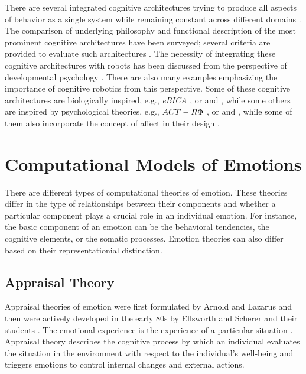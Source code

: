 \documentclass[12pt]{report}
\begin{document}
There are several integrated cognitive architectures trying to produce all
aspects of behavior as a single system while remaining constant across different
domains \cite{anderson:act-r, laird:soar}. The comparison of underlying
philosophy and functional description of the most prominent cognitive
architectures have been surveyed; several criteria are provided to evaluate such
architectures
\cite{chong:cognitive-architectures-survey,langley:cognitive-architectures,
thorisson:cognitive-architectures-autonomy}. The necessity of integrating these
cognitive architectures with robots has been discussed from the perspective of
developmental psychology \cite{asada:cognitive-robotics-humanoid,
d'mello:computational-functional-modeling,
kelley:cognitive-robotics-psychology}. There are also many examples emphasizing
the importance of cognitive robotics from this perspective. Some of these
cognitive architectures are biologically inspired, e.g., \textit{eBICA}
\cite{samsonovich:emotional-biologically-architecture}, or
\cite{baxter:cognitive-architecture-hri} and
\cite{ray:self-sustaining-architecture}, while some others are inspired by
psychological theories, e.g., $\MakeUppercase{ACT-R\Phi}$
\cite{dancy:actR-physiology-affect}, or
\cite{mirolli:vygotskyan-cognitive-robotics} and
\cite{dominey:shared-intention-cognition}, while some of them also incorporate
the concept of affect in their design \cite{cai:affective-model-psi}.

\section{Computational Models of Emotions}
There are different types of computational theories of emotion. These theories
differ in the type of relationships between their components and whether a
particular component plays a crucial role in an individual emotion. For
instance, the basic component of an emotion can be the behavioral tendencies,
the cognitive elements, or the somatic processes. Emotion theories can also
differ based on their representationial distinction.

\subsection{Appraisal Theory}
\label{sec:appraisal-theory}

Appraisal theories of emotion were first formulated by Arnold
\cite{arnold:emotion-personality} and Lazarus \cite{lazarus:emotion-adaptation}
and then were actively developed in the early 80s by Ellsworth and Scherer and
their students \cite{roseman:appraisal-theory}
\cite{sander:systems-approach-appraisal} \cite{scherer:nature-function-emotion}
\cite{scherer:emotions-emergent} \cite{scherer:appraisal-processes}. The
emotional experience is the experience of a particular situation
\cite{frijda:emotions}. Appraisal theory describes the cognitive process by
which an individual evaluates the situation in the environment with respect to
the individual's well-being and triggers emotions to control internal changes
and external actions.
\end{document}

